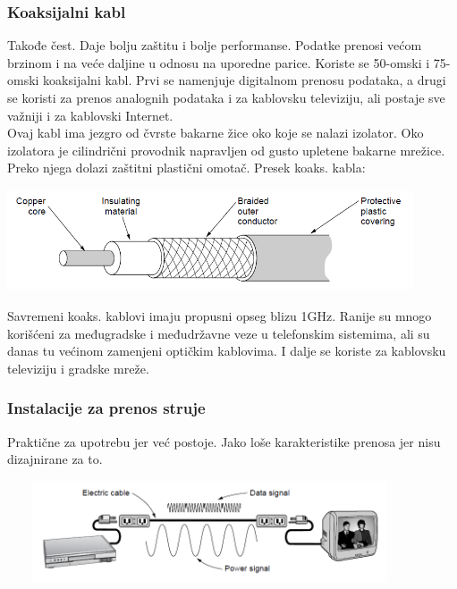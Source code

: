 \documentclass{article} %
\begin{document}
\subsubsection{Koaksijalni kabl}
Takođe čest. Daje bolju zaštitu i bolje performanse. Podatke prenosi većom brzinom i na veće daljine u odnosu na uporedne parice. Koriste se 50-omski i 75-omski koaksijalni kabl. Prvi se namenjuje digitalnom prenosu podataka, a drugi se koristi za prenos analognih podataka i za kablovsku televiziju, ali postaje sve važniji i za kablovski Internet. \\
Ovaj kabl ima jezgro od čvrste bakarne žice oko koje se nalazi izolator. Oko izolatora je cilindrični provodnik napravljen od gusto upletene bakarne mrežice. Preko njega dolazi zaštitni plastični omotač. Presek koaks. kabla:
\begin{center}
\includegraphics[width=12cm, height=3cm]{koaksijalni}\\
\end{center}
Savremeni koaks. kablovi imaju propusni opseg blizu 1GHz. Ranije su mnogo korišćeni za međugradske i međudržavne veze u telefonskim sistemima, ali su danas tu većinom zamenjeni optičkim kablovima. I dalje se koriste za kablovsku televiziju i gradske mreže.
\subsubsection{Instalacije za prenos struje}
Praktične za upotrebu jer već postoje. Jako loše karakteristike prenosa jer nisu dizajnirane za to.
\begin{center}
\includegraphics[width=12cm, height=3cm]{zicani}\\
\end{center}
\end{document}
